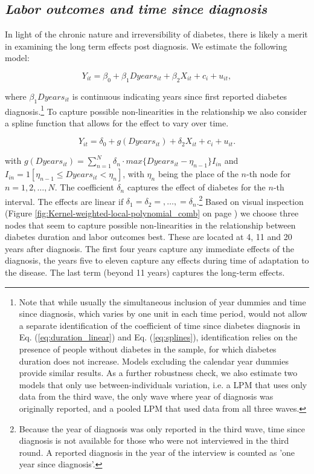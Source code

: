 \documentclass[12pt,english]{article}
\begin{document}
\subsection{\textit{Labor outcomes and time since diagnosis}}

In light of the chronic nature and irreversibility of diabetes, there is likely a merit in examining the long term effects post diagnosis.  We estimate the following model:

\begin{equation}
Y_{it}=\beta_{0}+\beta_{1}Dyears_{it}+\beta_{2}X_{it}+c_{i}+u_{it},\label{eq:duration_linear}
\end{equation}

\noindent where $\beta_{1}Dyears_{it}$ is continuous indicating years since first reported diabetes diagnosis.\footnote{Note that while usually the simultaneous inclusion of year dummies and time since diagnosis, which varies by one unit in each time period, would not allow a separate identification of the coefficient of time since diabetes diagnosis in Eq.  (\ref{eq:duration_linear}) and Eq.  (\ref{eq:splines}), identification relies on the presence of people without diabetes in the sample, for which diabetes duration does not increase.  Models excluding the calendar year dummies provide similar results.  As a further robustness check, we also estimate two models that only use between-individuals variation, i.e. a \ac{LPM} that uses only data from the third wave, the only wave where year of diagnosis was originally reported, and a pooled \ac{LPM} that used data from all three waves.} To capture possible non-linearities in the relationship we also consider a spline function that allows for the effect to vary over time.

\begin{equation}
Y_{it}=\delta_{0}+g(Dyears_{it})+\delta_{2}X_{it}+c_{i}+u_{it}.\label{eq:splines}
\end{equation}

\noindent with $g(Dyears_{it})=\sum_{n=1}^{N}\delta_{n}\cdot max\{Dyears_{it}-\eta_{n-1}\}I_{in}$ and $I_{in}=1[\eta_{n-1}\leq Dyears_{it}<\eta_{n}]$, with $\eta_{n}$ being the place of the $n$-th node for $n=1,2,\ldots,N$. The coefficient $\delta_{n}$ captures the effect of diabetes for the $n$-th interval. The effects are linear if $\delta_{1}=\delta_{2}=,\ldots,=\delta_{n}$.\footnote{Because the year of diagnosis was only reported in the third wave, time since diagnosis is not available for those who were not interviewed in the third round.  A reported diagnosis in the year of the interview is counted as 'one year since diagnosis'.} Based on visual inspection (Figure \ref{fig:Kernel-weighted-local-polynomial_comb} on page \pageref{fig:Kernel-weighted-local-polynomial_comb}) we choose three nodes that seem to capture possible non-linearities in the relationship between diabetes duration and labor outcomes best. These are located at 4, 11 and 20 years after diagnosis. The first four years capture any immediate effects of the diagnosis, the years five to eleven capture any effects during time of adaptation to the disease. The last term (beyond 11 years) captures the long-term effects.
\end{document}
